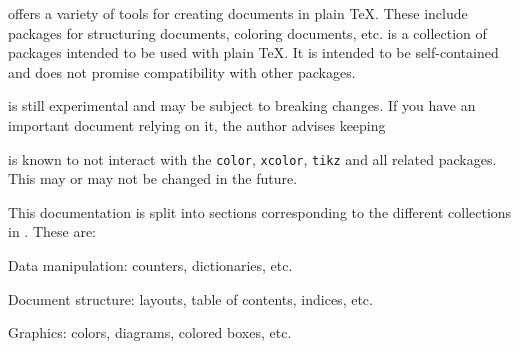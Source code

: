 \pdftoolbox{} offers a variety of tools for creating documents in plain \TeX.
These include packages for structuring documents, coloring documents, etc.
\pdftoolbox{} is a collection of packages intended to be used with plain \TeX.
It is intended to be self-contained and does not promise compatibility with other packages.

\bwarning

    \pdftoolbox{} is still experimental and may be subject to breaking changes.
    If you have an important document relying on it, the author advises keeping

\eppbox

\bwarning

    \pdftoolbox{} is known to not interact with the {\tt color}, {\tt xcolor}, {\tt tikz} and all related packages.
    This may or may not be changed in the future.

\eppbox

This documentation is split into sections corresponding to the different collections in \pdftoolbox.
These are:
\benum
    \item Data manipulation: counters, dictionaries, etc.
    \item Document structure: layouts, table of contents, indices, etc.
    \item Graphics: colors, diagrams, colored boxes, etc.
\eenum


